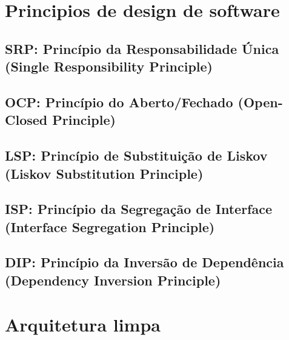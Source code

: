 \section{Principios de design de software}
    \subsection{SRP: Princípio da Responsabilidade Única (Single Responsibility Principle)}
    \subsection{OCP: Princípio do Aberto/Fechado (Open-Closed Principle)}
    \subsection{LSP: Princípio de Substituição de Liskov (Liskov Substitution Principle)}
    \subsection{ISP: Princípio da Segregação de Interface (Interface Segregation Principle)}
    \subsection{DIP: Princípio da Inversão de Dependência (Dependency Inversion Principle)}

\section{Arquitetura limpa}